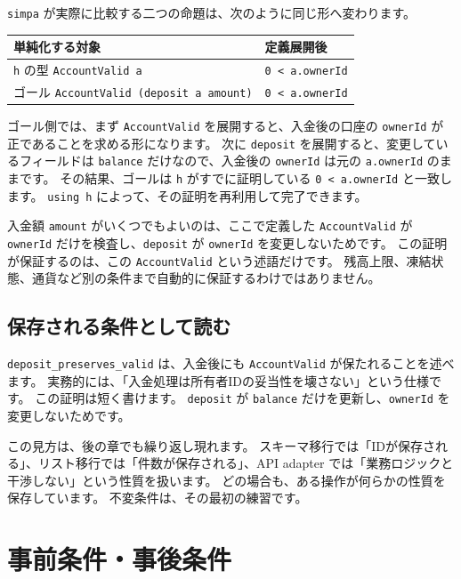 \texttt{simpa} が実際に比較する二つの命題は、次のように同じ形へ変わります。

\begin{center}
\begin{tabular}{p{}p{}}
\toprule
単純化する対象 & 定義展開後 \\
\midrule
\texttt{h} の型 \texttt{AccountValid a} & \texttt{0 < a.ownerId} \\
ゴール \texttt{AccountValid (deposit a amount)} & \texttt{0 < a.ownerId} \\
\bottomrule
\end{tabular}
\end{center}

ゴール側では、まず \texttt{AccountValid} を展開すると、入金後の口座の \texttt{ownerId} が正であることを求める形になります。
次に \texttt{deposit} を展開すると、変更しているフィールドは \texttt{balance} だけなので、入金後の \texttt{ownerId} は元の \texttt{a.ownerId} のままです。
その結果、ゴールは \texttt{h} がすでに証明している \texttt{0 < a.ownerId} と一致します。
\texttt{using h} によって、その証明を再利用して完了できます。

入金額 \texttt{amount} がいくつでもよいのは、ここで定義した \texttt{AccountValid} が \texttt{ownerId} だけを検査し、\texttt{deposit} が \texttt{ownerId} を変更しないためです。
この証明が保証するのは、この \texttt{AccountValid} という述語だけです。
残高上限、凍結状態、通貨など別の条件まで自動的に保証するわけではありません。

\subsection{保存される条件として読む}

\texttt{deposit\_preserves\_valid} は、入金後にも \texttt{AccountValid} が保たれることを述べます。
実務的には、「入金処理は所有者IDの妥当性を壊さない」という仕様です。
この証明は短く書けます。
\texttt{deposit} が \texttt{balance} だけを更新し、\texttt{ownerId} を変更しないためです。

この見方は、後の章でも繰り返し現れます。
スキーマ移行では「IDが保存される」、リスト移行では「件数が保存される」、API adapter では「業務ロジックと干渉しない」という性質を扱います。
どの場合も、ある操作が何らかの性質を保存しています。
不変条件は、その最初の練習です。

\section{事前条件・事後条件}

